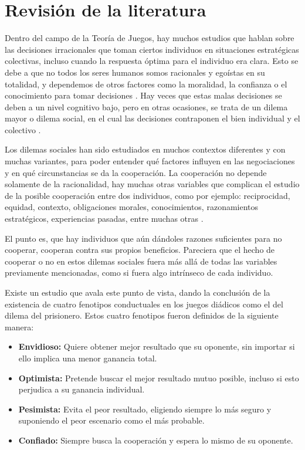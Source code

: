 \documentclass[a4paper,12pt]{report}
\begin{document}
\chapter{Revisión de la literatura}

Dentro del campo de la Teoría de Juegos, hay muchos estudios que hablan sobre las decisiones irracionales que toman ciertos individuos en situaciones estratégicas colectivas, incluso cuando la respuesta óptima para el individuo era clara. Esto se debe a que no todos los seres humanos somos racionales y egoístas en su totalidad, y dependemos de otros factores como la moralidad, la confianza o el conocimiento para tomar decisiones \cite{dawes1980social}. Hay veces que estas malas decisiones se deben a un nivel cognitivo bajo, pero en otras ocasiones, se trata de un dilema mayor o dilema social, en el cual las decisiones contraponen el bien individual y el colectivo \cite{kollock1998social}.

Los dilemas sociales han sido estudiados en muchos contextos diferentes y con muchas variantes, para poder entender qué factores influyen en las negociaciones y en qué circunstancias se da la cooperación. La cooperación no depende solamente de la racionalidad, hay muchas otras variables que complican el estudio de la posible cooperación entre dos individuos, como por ejemplo: reciprocidad, equidad, contexto, obligaciones morales, conocimientos, razonamientos estratégicos, experiencias pasadas, entre muchas otras \cite{sigmund2010calculus,camerer2003behavioral,kagel1995handbook,gintis2009game}.

El punto es, que hay individuos que aún dándoles razones suficientes para no cooperar, cooperan contra sus propios beneficios. Pareciera que el hecho de cooperar o no en estos dilemas sociales fuera más allá de todas las variables previamente mencionadas, como si fuera algo intrínseco de cada individuo.

Existe un estudio que avala este punto de vista, dando la conclusión de la existencia de cuatro fenotipos conductuales en los juegos diádicos como el del dilema del prisionero. Estos cuatro fenotipos fueron definidos de la siguiente manera:

\begin{itemize}
\item \textbf{Envidioso:} Quiere obtener mejor resultado que su oponente, sin importar si ello implica una menor ganancia total.
\item \textbf{Optimista:} Pretende buscar el mejor resultado mutuo posible, incluso si esto perjudica a su ganancia individual.
\item \textbf{Pesimista:} Evita el peor resultado, eligiendo siempre lo más seguro y suponiendo el peor escenario como el más probable.
\item \textbf{Confiado:} Siempre busca la cooperación y espera lo mismo de su oponente.
\end{itemize}
\end{document}

